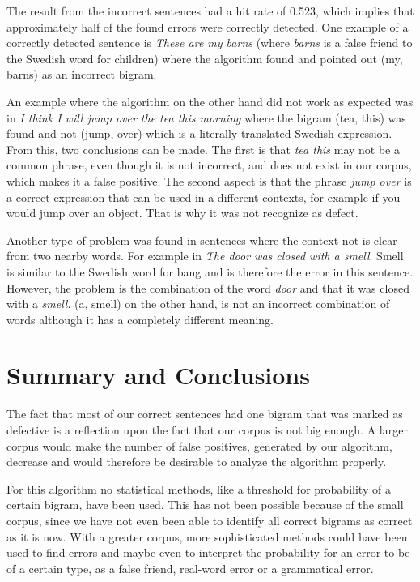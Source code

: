 \documentclass[a4paper,12pt]{article}
\begin{document}
The result from the incorrect sentences had a hit rate of 0.523, which implies that approximately half of the found errors were correctly detected. One example of a correctly detected sentence is \emph{These are my barns} (where \emph{barns} is a false friend to the Swedish word for children) where the algorithm found and pointed out (my, barns) as an incorrect bigram. 

An example where the algorithm on the other hand did not work as expected was in \emph{I think I will jump over the tea this morning} where the bigram (tea, this) was found and not (jump, over) which is a literally translated Swedish expression. From this, two conclusions can be made. The first is that \emph{tea this} may not be a common phrase, even though it is not incorrect, and does not exist in our corpus, which makes it a false positive. The second aspect is that the phrase \emph{jump over} is a correct expression that can be used in a different contexts, for example if you would jump over an object. That is why it was not recognize as defect. 

Another type of problem was found in sentences where the context not is clear from two nearby words. For example in \emph{The door was closed with a smell}. Smell is similar to the Swedish word for bang and is therefore the error in this sentence. However, the problem is the combination of the word \emph{door} and that it was closed with a \emph{smell}. (a, smell) on the other hand, is not an incorrect combination of words although it has a completely different meaning.

\section{Summary and Conclusions}
\label{sec:summary}
The fact that most of our correct sentences had one bigram that was marked as defective is a reflection upon the fact that our corpus is not big enough. A larger corpus would make the number of false positives, generated by our algorithm, decrease and would therefore be desirable to analyze the algorithm properly.

For this algorithm no statistical methods, like a threshold for probability of a certain bigram, have been used. This has not been possible because of the small corpus, since we have not even been able to identify all correct bigrams as correct as it is now. With a greater corpus, more sophisticated methods could have been used to find errors and maybe even to interpret the probability for an error to be of a certain type, as a false friend, real-word error or a grammatical error. 
\end{document}
